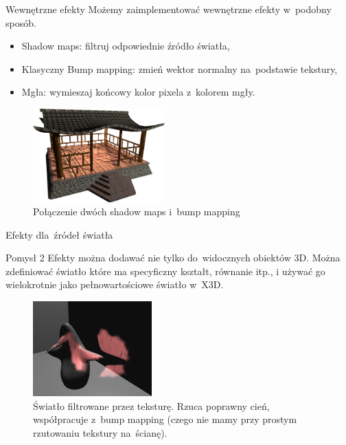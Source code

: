 \documentclass{beamer}
\begin{document}
\begin{frame}{Wewnętrzne efekty}
Możemy zaimplementować wewnętrzne efekty w~podobny sposób.

\begin{itemize}
  \item Shadow maps: filtruj odpowiednie źródło światła,
  \item Klasyczny Bump mapping: zmień wektor normalny na~podstawie tekstury,
  \item Mgła: wymieszaj końcowy kolor pixela z~kolorem mgły.
\end{itemize}

\begin{figure}
  \centering
  \includegraphics[width=2in]{../rhan_shrine_5_everything}
  \caption{Połączenie dwóch shadow maps i~bump mapping}
\end{figure}
\end{frame}

\begin{frame}{Efekty dla~źródeł światła}
\begin{block}{Pomysł 2}
Efekty można dodawać nie tylko do~widocznych obiektów 3D.
Można zdefiniować światło które ma specyficzny kształt, równanie itp.,
i używać go wielokrotnie jako pełnowartościowe światło w~X3D.
\end{block}

\begin{figure}
  \centering
  \includegraphics[width=1.8in]{../fancy_light_spot_shape}
  \caption{Światło filtrowane przez teksturę. Rzuca poprawny cień, współpracuje z~bump mapping (czego nie mamy przy prostym rzutowaniu tekstury na~ścianę).}
\end{figure}
\end{frame}
\end{document}
